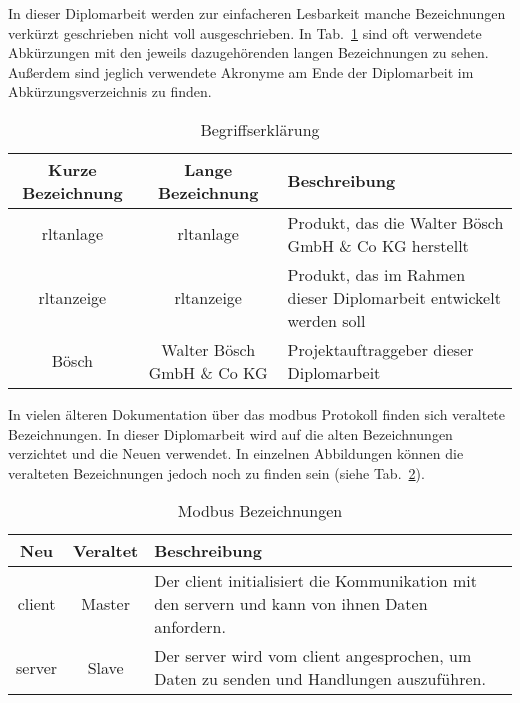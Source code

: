  \label{begriffserklaerung}

\noindent In dieser Diplomarbeit werden zur einfacheren Lesbarkeit manche Bezeichnungen verkürzt geschrieben \bzw nicht voll ausgeschrieben. In Tab.~\ref{tab:begriffserklaerung} sind oft verwendete Abkürzungen mit den jeweils dazugehörenden langen Bezeichnungen zu sehen. Außerdem sind jeglich verwendete Akronyme am Ende der Diplomarbeit im Abkürzungsverzeichnis zu finden. 
\begin{table}[h]
	\caption{Begriffserklärung \label{tab:begriffserklaerung}}
	\begin{tabularx}{\textwidth}{@{}c|c|X@{}}
		\toprule
		\textbf{Kurze Bezeichnung} & \textbf{Lange Bezeichnung} & \textbf{Beschreibung} \\
		\midrule
        \acs{rltanlage} & \Acl{rltanlage} &  Produkt, das die Walter Bösch GmbH \& Co KG herstellt \\
		\acs{rltanzeige} & \acl{rltanzeige} &  Produkt, das im Rahmen dieser Diplomarbeit entwickelt werden soll \\
		Bösch & Walter Bösch GmbH \& Co KG & Projektauftraggeber dieser Diplomarbeit \\
		\bottomrule
	\end{tabularx}
\end{table}


In vielen älteren Dokumentation über das \gls{modbus} Protokoll finden sich veraltete Bezeichnungen. In dieser Diplomarbeit wird auf die alten Bezeichnungen verzichtet und die Neuen verwendet. In einzelnen Abbildungen können die veralteten Bezeichnungen jedoch noch zu finden sein (siehe Tab.~\ref{tab:modbus_bezeichnung}). 
\begin{table}[h]
	\caption{Modbus Bezeichnungen \label{tab:modbus_bezeichnung}}
	\begin{tabularx}{\textwidth}{@{}c|c|X@{}}
		\toprule
		\textbf{Neu} & \textbf{Veraltet} & \textbf{Beschreibung} \\
		\midrule
		\gls{client} & Master & Der \gls{client} initialisiert die Kommunikation mit den \gls{server}n und kann von ihnen Daten anfordern. \\
		\gls{server} & Slave & Der \gls{server} wird vom \gls{client} angesprochen, um Daten zu senden und Handlungen auszuführen. \\
		\bottomrule
	\end{tabularx}
\end{table}


